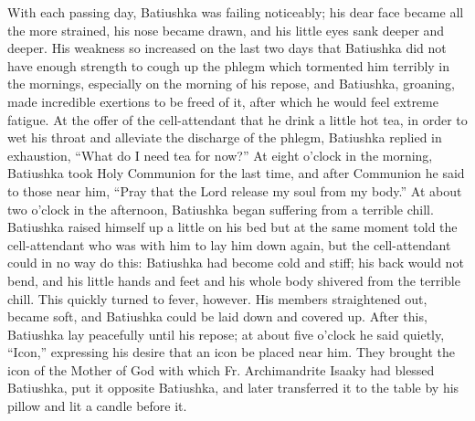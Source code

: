 With each passing day, Batiushka was failing noticeably; his dear face became all the more strained, his nose became drawn, and his little eyes sank deeper and deeper. His weakness so increased on the last two days that Batiushka did not have enough strength to cough up the phlegm which tormented him terribly in the mornings, especially on the morning of his repose, and Batiushka, groaning, made incredible exertions to be freed of it, after which he would feel extreme fatigue. At the offer of the cell-attendant that he drink a little hot tea, in order to wet his throat and alleviate the discharge of the phlegm, Batiushka replied in exhaustion, “What do I need tea for now?” At eight o'clock in the morning, Batiushka took Holy Communion for the last time, and after Communion he said to those near him, “Pray that the Lord release my soul from my body.” At about two o'clock in the afternoon, Batiushka began suffering from a terrible chill. Batiushka raised himself up a little on his bed but at the same moment told the cell-attendant who was with him to lay him down again, but the cell-attendant could in no way do this: Batiushka had become cold and stiff; his back would not bend, and his little hands and feet and his whole body shivered from the terrible chill. This quickly turned to fever, however. His members straightened out, became soft, and Batiushka could be laid down and covered up. After this, Batiushka lay peacefully until his repose; at about five o'clock he said quietly, “Icon,” expressing his desire that an icon be placed near him. They brought the icon of the Mother of God with which Fr. Archimandrite Isaaky had blessed Batiushka, put it opposite Batiushka, and later transferred it to the table by his pillow and lit a candle before it.

